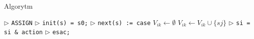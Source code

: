 \documentclass{article}
\begin{document}
\begin{algorithm}
\caption{Algorytm}
\label{alg:i_dont_know}
\begin{algorithmic}
\State $\triangleright$ \verb!ASSIGN!
\State $\triangleright$ \verb!init(s) = s0;!
\State $\triangleright$ \verb!next(s) := case!
		\State $V_{ik} \gets \emptyset$
				\State $V_{ik} \gets V_{ik} \cup \{sj\}$
			\EndIf
		\EndFor
		\State $\triangleright$ \verb!si = si & action!
	\EndFor
\EndFor
\State $\triangleright$ \verb!esac;!
\end{algorithmic}
\end{algorithm}
 
\end{document}
